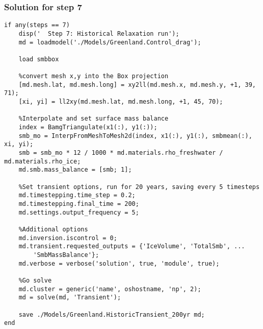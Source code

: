 \subsubsection{Solution for step 7} %
\begin{lstlisting}
if any(steps == 7)
	disp('  Step 7: Historical Relaxation run');
	md = loadmodel('./Models/Greenland.Control_drag');

	load smbbox

	%convert mesh x,y into the Box projection
	[md.mesh.lat, md.mesh.long] = xy2ll(md.mesh.x, md.mesh.y, +1, 39, 71);
	[xi, yi] = ll2xy(md.mesh.lat, md.mesh.long, +1, 45, 70);

	%Interpolate and set surface mass balance
	index = BamgTriangulate(x1(:), y1(:));
	smb_mo = InterpFromMeshToMesh2d(index, x1(:), y1(:), smbmean(:), xi, yi);
	smb = smb_mo * 12 / 1000 * md.materials.rho_freshwater / md.materials.rho_ice;
	md.smb.mass_balance = [smb; 1];

	%Set transient options, run for 20 years, saving every 5 timesteps
	md.timestepping.time_step = 0.2;
	md.timestepping.final_time = 200;
	md.settings.output_frequency = 5;

	%Additional options
	md.inversion.iscontrol = 0;
	md.transient.requested_outputs = {'IceVolume', 'TotalSmb', ...
		'SmbMassBalance'};
	md.verbose = verbose('solution', true, 'module', true);

	%Go solve
	md.cluster = generic('name', oshostname, 'np', 2);
	md = solve(md, 'Transient');

	save ./Models/Greenland.HistoricTransient_200yr md;
end
\end{lstlisting}

